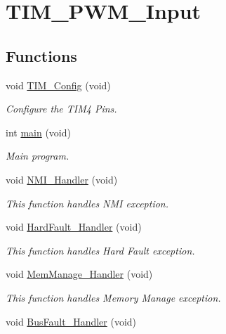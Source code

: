 \hypertarget{group___t_i_m___p_w_m___input}{\section{T\-I\-M\-\_\-\-P\-W\-M\-\_\-\-Input}
\label{group___t_i_m___p_w_m___input}
}
\subsection*{Functions}
\begin{DoxyCompactItemize}
\item 
void \hyperlink{group___t_i_m___p_w_m___input_ga54ca0fe4856d5d1a9e66faf7141c4d5b}{T\-I\-M\-\_\-\-Config} (void)
\begin{DoxyCompactList}\small\item\em Configure the T\-I\-M4 Pins. \end{DoxyCompactList}\item 
int \hyperlink{group___t_i_m___p_w_m___input_ga840291bc02cba5474a4cb46a9b9566fe}{main} (void)
\begin{DoxyCompactList}\small\item\em Main program. \end{DoxyCompactList}\item 
void \hyperlink{group___t_i_m___p_w_m___input_ga6ad7a5e3ee69cb6db6a6b9111ba898bc}{N\-M\-I\-\_\-\-Handler} (void)
\begin{DoxyCompactList}\small\item\em This function handles N\-M\-I exception. \end{DoxyCompactList}\item 
void \hyperlink{group___t_i_m___p_w_m___input_ga2bffc10d5bd4106753b7c30e86903bea}{Hard\-Fault\-\_\-\-Handler} (void)
\begin{DoxyCompactList}\small\item\em This function handles Hard Fault exception. \end{DoxyCompactList}\item 
void \hyperlink{group___t_i_m___p_w_m___input_ga3150f74512510287a942624aa9b44cc5}{Mem\-Manage\-\_\-\-Handler} (void)
\begin{DoxyCompactList}\small\item\em This function handles Memory Manage exception. \end{DoxyCompactList}\item 
void \hyperlink{group___t_i_m___p_w_m___input_ga850cefb17a977292ae5eb4cafa9976c3}{Bus\-Fault\-\_\-\-Handler} (void)

\end{DoxyCompactItemize}
